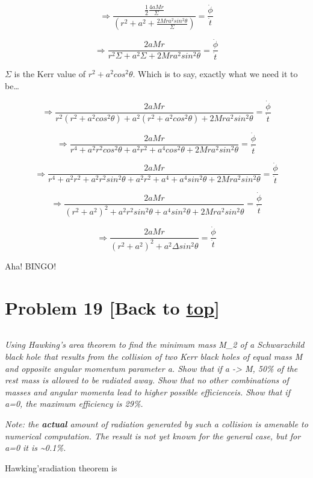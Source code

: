 \documentclass[landscape,letterpaper,10pt,english]{article}
\begin{document}
\[ \Rightarrow \frac{\frac12 \frac{4aMr}{\Sigma}}{\left( r^2 + a^2 + \frac{2Mra^2sin^2\theta}{\Sigma} \right) } =  \frac{\dot \phi}{\dot t} \]

\[ \Rightarrow \frac{2aMr}{r^2\Sigma + a^2\Sigma + 2Mra^2sin^2\theta } =  \frac{\dot \phi}{\dot t} \]

\(\Sigma\) is the Kerr value of \(r^2+a^2cos^2\theta\). Which is to say,
exactly what we need it to be\ldots{}

    \[ \Rightarrow \frac{2aMr}{r^2(r^2+a^2cos^2\theta)+ a^2(r^2+a^2cos^2\theta) + 2Mra^2sin^2\theta } =  \frac{\dot \phi}{\dot t} \]

\[ \Rightarrow \frac{2aMr}{r^4+a^2r^2cos^2\theta+ a^2r^2+a^4cos^2\theta + 2Mra^2sin^2\theta } =  \frac{\dot \phi}{\dot t} \]

\[ \Rightarrow \frac{2aMr}{r^4+a^2r^2+a^2r^2sin^2\theta+ a^2r^2+a^4+a^4sin^2\theta + 2Mra^2sin^2\theta } =  \frac{\dot \phi}{\dot t} \]

\[ \Rightarrow \frac{2aMr}{(r^2+a^2)^2 + a^2r^2sin^2\theta +a^4sin^2\theta + 2Mra^2sin^2\theta } =  \frac{\dot \phi}{\dot t} \]

\[ \Rightarrow \frac{2aMr}{(r^2+a^2)^2 + a^2\Delta sin^2\theta } =  \frac{\dot \phi}{\dot t} \]

Aha! BINGO!

    \hypertarget{problem-19-back-to-top}{%
\section{\texorpdfstring{Problem 19 {[}Back to
\hyperref[toc]{top}{]}}{Problem 19 {[}Back to {]}}}\label{problem-19-back-to-top}}

\[\label{P19}\]

\emph{Using Hawking's area theorem to find the minimum mass M\_2 of a
Schwarzchild black hole that results from the collision of two Kerr
black holes of equal mass M and opposite angular momentum parameter a.
Show that if \textbar a\textbar{} -\textgreater{} M, 50\% of the rest
mass is allowed to be radiated away. Show that no other combinations of
masses and angular momenta lead to higher possible efficienceis. Show
that if a=0, the maximum efficiency is 29\%.}

\emph{Note: the \textbf{actual} amount of radiation generated by such a
collision is amenable to numerical computation. The result is not yet
known for the general case, but for a=0 it is \textasciitilde0.1\%.}

    Hawking'sradiation theorem is
\end{document}
